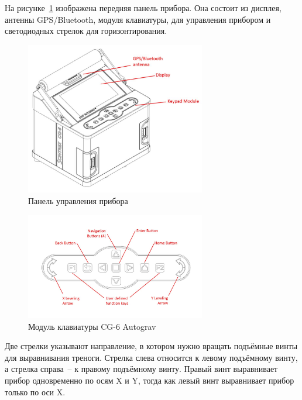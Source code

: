 На рисунке~\ref{fig:the_cg6_autograv_console} изображена передняя панель
прибора. Она состоит из дисплея, антенны GPS/Bluetooth, модуля клавиатуры, для
управления прибором и светодиодных стрелок для горизонтирования.

\begin{figure}%
  \centering
  \includegraphics[width=0.7\textwidth]{figures/the_cg6_autograv_console}
  \caption{Панель управления прибора \cg{}}
  \label{fig:the_cg6_autograv_console}
\end{figure}

\begin{figure}%
  \centering
  \includegraphics[width=0.7\textwidth]{figures/the_cg6_autograv_keypad_module}
  \caption{Модуль клавиатуры CG-6 Autograv}
  \label{fig:the_cg6_autograv_keypad_module}
\end{figure}

Две стрелки указывают направление, в котором нужно вращать подъёмные винты
для выравнивания треноги. Стрелка слева относится к левому подъёмному 
винту, а стрелка справа~-- к правому подъёмному винту.  Правый винт
выравнивает прибор одновременно по осям X и Y, тогда как левый винт выравнивает
прибор только по оси X.


